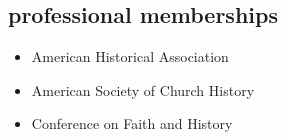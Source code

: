 \documentclass[11pt]{article}
\providecommand{\tightlist}{%
  \setlength{\itemsep}{0pt}\setlength{\parskip}{0pt}}
\begin{document}


\subsection{professional memberships}\label{professional-memberships}

\begin{itemize}
    \tightlist
    \item American Historical Association
    \item American Society of Church History
    \item Conference on Faith and History
\end{itemize}
\end{document}
